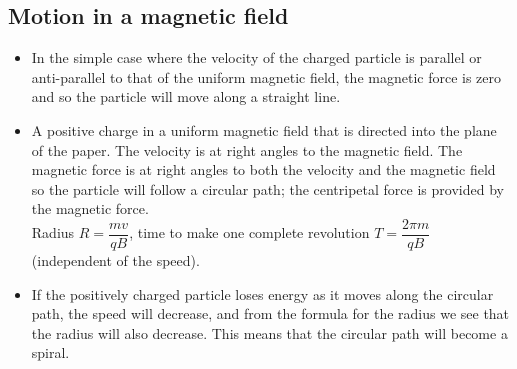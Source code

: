 \subsection{Motion in a magnetic field}
\begin{itemize}
  \item In the simple case where the velocity of the charged particle is parallel or anti-parallel to that of the uniform magnetic field, the magnetic force is zero and so the particle will move along a straight line.
  \item A positive charge in a uniform magnetic field that is directed into the plane of the paper. The velocity is at right angles to the magnetic field. The magnetic force is at right angles to both the velocity and the magnetic field so the particle will follow a circular path; the centripetal force is provided by the magnetic force.\\
  Radius $R=\dfrac{mv}{qB}$, time to make one complete revolution $T=\dfrac{2\pi m}{qB}$ (independent of the speed).
  \item If the positively charged particle loses energy as it moves along the circular path, the speed will decrease, and from the formula for the radius we see that the radius will also decrease. This means that the circular path will become a spiral.
\end{itemize}

